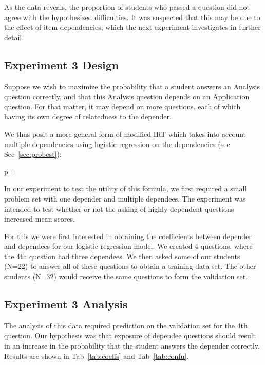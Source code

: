 As the data reveals, the proportion of students who passed a question did not
agree with the hypothesized difficulties.  It was suspected that this may be
due to the effect of item dependencies, which the next experiment investigates
in further detail.

\subsection{Experiment 3 Design}

Suppose we wish to maximize the probability that a student answers an Analysis
question correctly, and that this Analysis question depends on an Application
question.  For that matter, it may depend on more questions, each of which
having its own degree of relatedness to the depender.

We thus posit a more general form of modified IRT which takes into account
multiple dependencies using logistic regression on the dependencies (see
Sec~\ref{sec:probest}):

\begin{equations}
  p = 
  \tag{\ref{eq:modirt}}
\end{equations}

In our experiment to test the utility of this formula, we first required a
small problem set with one depender and multiple dependees.  The experiment was
intended to test whether or not the asking of highly-dependent questions
increased mean scores.

For this we were first interested in obtaining the coefficients between
depender and dependees for our logistic regression model.  We created 4
questions, where the 4th question had three dependees.  We then asked some of
our students (N=22) to answer all of these questions to obtain a training data
set.  The other students (N=32) would receive the same questions to form 
the validation set.

\subsection{Experiment 3 Analysis}  

The analysis of this data required prediction on the validation set for the 4th
question.  Our hypothesis was that exposure of dependee questions should result
in an increase in the probability that the student answers the depender
correctly.   Results are shown in Tab~\ref{tab:coeffs} and Tab~\ref{tab:confu}.

